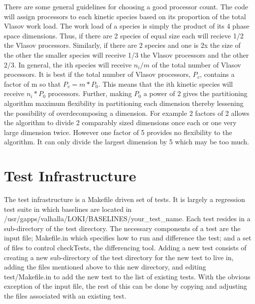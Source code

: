 \documentclass[11pt]{amsart}
\begin{document}
There are some general guidelines for choosing a good processor count.  The code
will assign processors to each kinetic species based on its proportion of the
total Vlasov work load.  The work load of a species is simply the product of its
4 phase space dimensions.  Thus, if there are 2 species of equal size each will
recieve 1/2 the Vlasov processors.  Similarly, if there are 2 species and one
is 2x the size of the other the smaller species will receive 1/3 the Vlasov
processors and the other 2/3.  In general, the ith species will receive
\begin{math} n_{i}/m \end{math} of the total number of Vlasov processors.  It
is best if the total number of Vlasov processors,
\begin {math} P_{v} \end{math}, contains a factor of m so that
\begin {math} P_{v} = m*P_{0} \end {math}.  This means that the ith kinetic
species will receive \begin {math} n_{i}*P_{0} \end {math} processors.  Further,
making \begin {math} P_{0} \end {math} a power of 2 gives the partitioning
algorithm maximum flexibility in partitioning each dimension thereby lessening
the possibility of overdecomposing a dimension.  For example 2 factors of 2
allows the algorithm to divide 2 comparably sized dimensions once each or one
very large dimension twice.  However one factor of 5 provides no flexibility
to the algorithm.  It can only divide the largest dimension by 5 which may be
too much.

\section*{Test Infrastructure}
The test infrastructure is a Makefile driven set of tests.  It is largely a
regression test suite in which baselines are located in
/usr/gapps/valhalla/LOKI/BASELINES/your\_test\_name.  Each test resides in a
sub-directory of the test directory.  The necessary components of a test are the
input file; Makefile.in which specifies how to run and difference the test; and
a set of files to control checkTests, the differencing tool.  Adding a new test
consists of creating a new sub-directory of the test directory for the new test
to live in, adding the files mentioned above to this new directory, and editing
test/Makefile.in to add the new test to the list of existing tests.  With the
obvious exception of the input file, the rest of this can be done by copying and
adjusting the files associated with an existing test.
\end{document}
